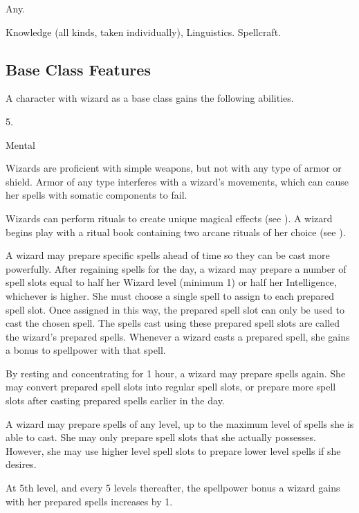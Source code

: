  Any.

 Knowledge (all kinds, taken individually), Linguistics.
 Spellcraft.

\subsection{Base Class Features}
A character with wizard as a base class gains the following abilities.

 5.

  Mental

Wizards are proficient with simple weapons, but not with any type of armor or shield.
Armor of any type interferes with a wizard's movements, which can cause her spells with somatic components to fail.

Wizards can perform rituals to create unique magical effects (see ).
A wizard begins play with a ritual book containing two arcane rituals of her choice (see ).

A wizard may prepare specific spells ahead of time so they can be cast more powerfully.
After regaining spells for the day, a wizard may prepare a number of spell slots equal to half her Wizard level (minimum 1) or half her Intelligence, whichever is higher.
She must choose a single spell to assign to each prepared spell slot.
Once assigned in this way, the prepared spell slot can only be used to cast the chosen spell.
The spells cast using these prepared spell slots are called the wizard's prepared spells.
Whenever a wizard casts a prepared spell, she gains a  bonus to spellpower with that spell.

By resting and concentrating for 1 hour, a wizard may prepare spells again.
She may convert prepared spell slots into regular spell slots, or prepare more spell slots after casting prepared spells earlier in the day.

A wizard may prepare spells of any level, up to the maximum level of spells she is able to cast.
She may only prepare spell slots that she actually possesses.
However, she may use higher level spell slots to prepare lower level spells if she desires.

At 5th level, and every 5 levels thereafter, the spellpower bonus a wizard gains with her prepared spells increases by 1.

